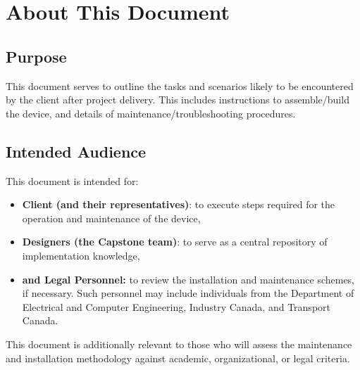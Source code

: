 \documentclass[10pt,letterpaper]{article}
\begin{document}


\section{About This Document}

\subsection{Purpose}
This document serves to outline the tasks and scenarios likely to be encountered by the client after project delivery. This includes instructions to assemble/build the device, and details of maintenance/troubleshooting procedures. 

\subsection{Intended Audience}
This document is intended for:
\begin{itemize}
\item \textbf{Client (and their representatives)}: to execute steps required for the operation and maintenance of the device,
\item \textbf{Designers (the Capstone team)}: to serve as a central repository of implementation knowledge,
\item \textbf{and Legal Personnel:} to review the installation and maintenance schemes, if necessary. Such personnel may include individuals from the Department of Electrical and Computer Engineering, Industry Canada, and Transport Canada.
\end{itemize}

This document is additionally relevant to those who will assess the maintenance and installation methodology against academic, organizational, or legal criteria.
\end{document}
